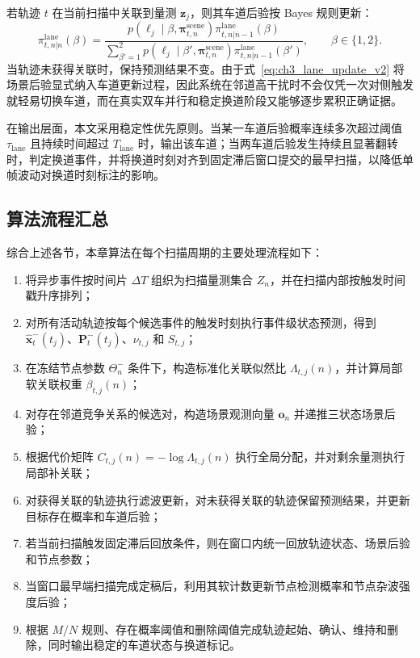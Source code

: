\documentclass{xdupgthesis}
\begin{document}
若轨迹 $t$ 在当前扫描中关联到量测 $\mathbf z_j$，则其车道后验按 Bayes 规则更新：
\begin{equation}
	\pi_{t,n|n}^{\mathrm{lane}}(\beta)
	=
	\frac{p(\ell_j\mid \beta,\boldsymbol\pi_{t,n}^{\mathrm{scene}})\pi_{t,n|n-1}^{\mathrm{lane}}(\beta)}{\sum_{\beta'=1}^{2}p(\ell_j\mid \beta',\boldsymbol\pi_{t,n}^{\mathrm{scene}})\pi_{t,n|n-1}^{\mathrm{lane}}(\beta')},
	\qquad \beta\in\{1,2\}.
	\label{eq:ch3_lane_update_v2}
\end{equation}
当轨迹未获得关联时，保持预测结果不变。由于式~\eqref{eq:ch3_lane_update_v2} 将场景后验显式纳入车道更新过程，因此系统在邻道高干扰时不会仅凭一次对侧触发就轻易切换车道，而在真实双车并行和稳定换道阶段又能够逐步累积正确证据。

在输出层面，本文采用稳定性优先原则。当某一车道后验概率连续多次超过阈值 $\tau_{\mathrm{lane}}$ 且持续时间超过 $T_{\mathrm{lane}}$ 时，输出该车道；当两车道后验发生持续且显著翻转时，判定换道事件，并将换道时刻对齐到固定滞后窗口提交的最早扫描，以降低单帧波动对换道时刻标注的影响。

\subsection{算法流程汇总}

综合上述各节，本章算法在每个扫描周期的主要处理流程如下：
\begin{enumerate}
	\item 将异步事件按时间片 $\Delta T$ 组织为扫描量测集合 $Z_n$，并在扫描内部按触发时间戳升序排列；
	\item 对所有活动轨迹按每个候选事件的触发时刻执行事件级状态预测，得到 $\hat{\mathbf x}^-_t(t_j)$、$\mathbf P^-_t(t_j)$、$\nu_{t,j}$ 和 $S_{t,j}$；
	\item 在冻结节点参数 $\Theta_n^{-}$ 条件下，构造标准化关联似然比 $\Lambda_{t,j}(n)$，并计算局部软关联权重 $\beta_{t,j}(n)$；
	\item 对存在邻道竞争关系的候选对，构造场景观测向量 $\mathbf o_n$ 并递推三状态场景后验；
	\item 根据代价矩阵 $C_{t,j}(n)=-\log\Lambda_{t,j}(n)$ 执行全局分配，并对剩余量测执行局部补关联；
	\item 对获得关联的轨迹执行滤波更新，对未获得关联的轨迹保留预测结果，并更新目标存在概率和车道后验；
	\item 若当前扫描触发固定滞后回放条件，则在窗口内统一回放轨迹状态、场景后验和节点参数；
	\item 当窗口最早端扫描完成定稿后，利用其软计数更新节点检测概率和节点杂波强度后验；
	\item 根据 $M/N$ 规则、存在概率阈值和删除阈值完成轨迹起始、确认、维持和删除，同时输出稳定的车道状态与换道标记。
\end{enumerate}
\end{document}
